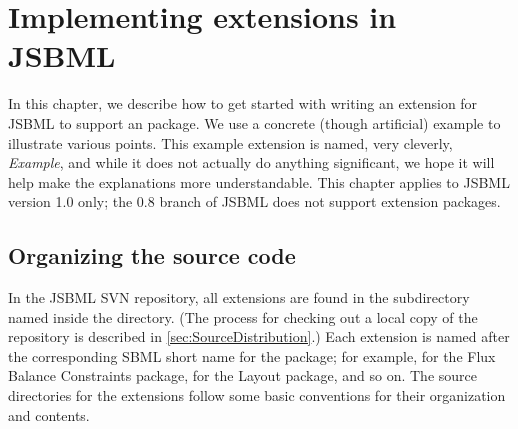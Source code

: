 
\chapter{Implementing extensions in JSBML}
\label{sec:howToExtension}

In this chapter, we describe how to get started with writing an extension
for JSBML to support an \SBMLthree package.  We use a concrete (though
artificial) example to illustrate various points.  This example extension
is named, very cleverly, \emph{Example}, and while it does not actually do
anything significant, we hope it will help make the explanations more
understandable. This chapter applies to JSBML version 1.0 only;
the 0.8 branch of JSBML does not support extension packages.


\section{Organizing the source code}
\label{sec:example-organization}

In the JSBML SVN repository, all extensions are found in the subdirectory
named  inside the  directory.  (The process
for checking out a local copy of the repository is described
in \vref{sec:SourceDistribution}.) Each extension is named after the
corresponding SBML short name for the \SBMLthree package; for example,
 for the Flux Balance Constraints package,  for the
Layout package, and so on.  The source directories for the extensions
follow some basic conventions for their organization and contents.

